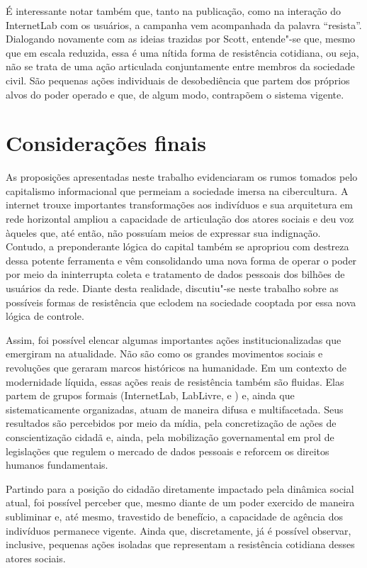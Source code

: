 É interessante notar também que, tanto na publicação, como na interação
do InternetLab com os usuários, a campanha vem acompanhada da palavra
``resista''. Dialogando novamente com as ideias trazidas por Scott,
entende"-se que, mesmo que em escala reduzida, essa é uma nítida forma de
resistência cotidiana, ou seja, não se trata de uma ação articulada
conjuntamente entre membros da sociedade civil. São pequenas ações
individuais de desobediência que partem dos próprios alvos do poder
operado e que, de algum modo, contrapõem o sistema vigente.

\section{Considerações finais}

As proposições apresentadas neste trabalho evidenciaram os rumos tomados
pelo capitalismo informacional que permeiam a sociedade imersa na
cibercultura. A internet trouxe importantes transformações aos
indivíduos e sua arquitetura em rede horizontal ampliou a capacidade de
articulação dos atores sociais e deu voz àqueles que, até então, não
possuíam meios de expressar sua indignação. Contudo, a preponderante
lógica do capital também se apropriou com destreza dessa potente
ferramenta e vêm consolidando uma nova forma de operar o poder por meio
da ininterrupta coleta e tratamento de dados pessoais dos bilhões de
usuários da rede. Diante desta realidade, discutiu"-se neste trabalho
sobre as possíveis formas de resistência que eclodem na sociedade
cooptada por essa nova lógica de controle.

Assim, foi possível elencar algumas importantes ações
institucionalizadas que emergiram na atualidade. Não são como os grandes
movimentos sociais e revoluções que geraram marcos históricos na
humanidade. Em um contexto de modernidade líquida, essas ações reais de
resistência também são fluidas. Elas partem de grupos formais
(InternetLab, LabLivre,  e ) e, ainda que sistematicamente
organizadas, atuam de maneira difusa e multifacetada. Seus resultados
são percebidos por meio da mídia, pela concretização de ações de
conscientização cidadã e, ainda, pela mobilização governamental em prol
de legislações que regulem o mercado de dados pessoais e reforcem os
direitos humanos fundamentais.

Partindo para a posição do cidadão diretamente impactado pela dinâmica
social atual, foi possível perceber que, mesmo diante de um poder
exercido de maneira subliminar e, até mesmo, travestido de benefício, a
capacidade de agência dos indivíduos permanece vigente. Ainda que,
discretamente, já é possível observar, inclusive, pequenas ações
isoladas que representam a resistência cotidiana desses atores sociais.

